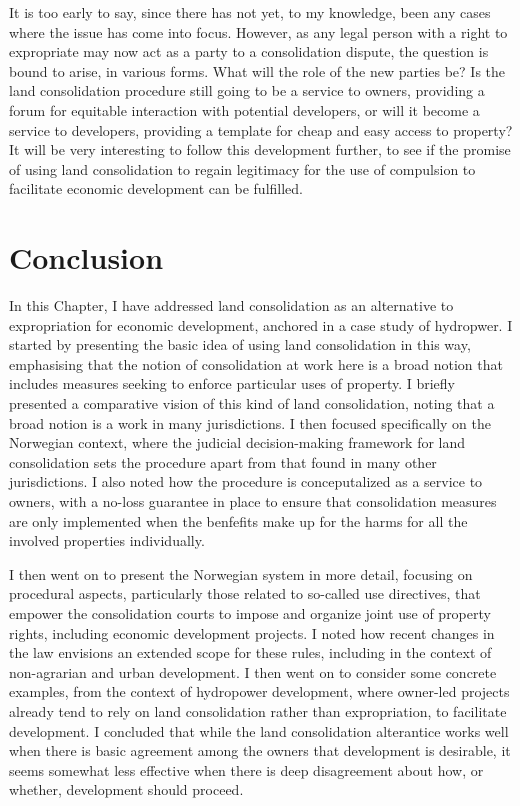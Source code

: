 It is too early to say, since there has not yet, to my knowledge, been any cases where the issue has come into focus. However, as any legal person with a right to expropriate may now act as a party to a consolidation dispute, the question is bound to arise, in various forms. What will the role of the new parties be? Is the land consolidation procedure still going to be a service to owners, providing a forum for equitable interaction with potential developers, or will it become a service to developers, providing a template for cheap and easy access to property? It will be very interesting to follow this development further, to see if the promise of using land consolidation to regain legitimacy for the use of compulsion to facilitate economic development can be fulfilled.

\section{Conclusion}\label{sec:conc}

In this Chapter, I have addressed land consolidation as an alternative to expropriation for economic development, anchored in a case study of hydropwer. I started by presenting the basic idea of using land consolidation in this way, emphasising that the notion of consolidation at work here is a broad notion that includes measures seeking to enforce particular uses of property. I briefly presented a comparative vision of this kind of land consolidation, noting that a broad notion is a work in many jurisdictions. I then focused specifically on the Norwegian context, where the judicial decision-making framework for land consolidation sets the procedure apart from that found in many other jurisdictions. I also noted how the procedure is conceputalized as a service to owners, with a no-loss guarantee in place to ensure that consolidation measures are only implemented when the benfefits make up for the harms for all the involved properties individually.

I then went on to present the Norwegian system in more detail, focusing on procedural aspects, particularly those related to so-called use directives, that empower the consolidation courts to impose and organize joint use of property rights, including economic development projects. I noted how recent changes in the law envisions an extended scope for these rules, including in the context of non-agrarian and urban development. I then went on to consider some concrete examples, from the context of hydropower development, where owner-led projects already tend to rely on land consolidation rather than expropriation, to facilitate development. I concluded that while the land consolidation alterantice works well when there is basic agreement among the owners that development is desirable, it seems somewhat less effective when there is deep disagreement about how, or whether, development should proceed. 

